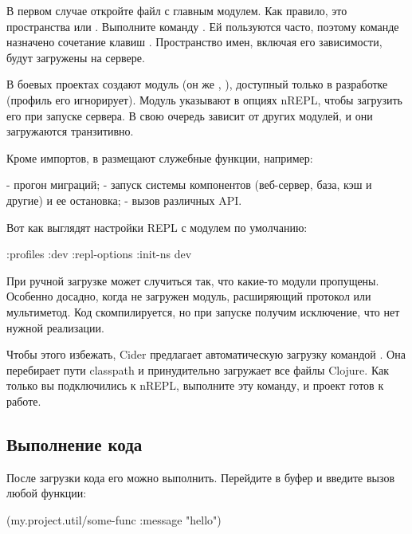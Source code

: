 В первом случае откройте файл с главным модулем. Как правило, это пространства  или . Выполните команду . Ей пользуются часто, поэтому команде назначено сочетание клавиш . Пространство имен, включая его зависимости, будут загружены на сервере.

В боевых проектах создают модуль  (он же , ), доступный только в разработке (профиль  его игнорирует). Модуль указывают в опциях nREPL, чтобы загрузить его при запуске сервера. В свою очередь  зависит от других модулей, и они загружаются транзитивно.

Кроме импортов, в  размещают служебные функции, например:

- прогон миграций;
- запуск системы компонентов (веб-сервер, база, кэш и другие) и ее остановка;
- вызов различных API.

Вот как выглядят настройки REPL с модулем  по умолчанию:

\begin{english}
  \begin{clojure}
{:profiles
 {:dev
  {:repl-options {:init-ns dev}}}}
  \end{clojure}
\end{english}

При ручной загрузке может случиться так, что какие-то модули пропущены. Особенно досадно, когда не загружен модуль, расширяющий протокол или мультиметод. Код скомпилируется, но при запуске получим исключение, что нет нужной реализации.

Чтобы этого избежать, Cider предлагает автоматическую загрузку командой . Она перебирает пути classpath и принудительно загружает все файлы Clojure. Как только вы подключились к nREPL, выполните эту команду, и проект готов к работе.

\subsection{Выполнение кода}

После загрузки кода его можно выполнить. Перейдите в буфер  и введите вызов любой функции:

\begin{english}
  \begin{clojure}
(my.project.util/some-func {:message "hello"})
  \end{clojure}
\end{english}

